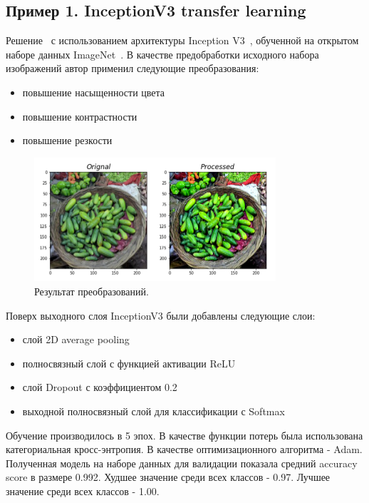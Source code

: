 \documentclass[a4paper,12pt]{extarticle}
\begin{document}
\subsection{Пример 1. InceptionV3 transfer learning}

Решение~\cite{example_1} с использованием архитектуры Inception V3~\cite{inceptionV3}, обученной
на открытом наборе данных ImageNet~\cite{imagenet}. В качестве предобработки исходного набора
изображений автор применил следующие преобразования:

\begin{itemize}
	\item повышение насыщенности цвета
	\item повышение контрастности
	\item повышение резкости
\end{itemize}

\begin{figure}[ht]
	\centering
	\includegraphics[width=0.8\textwidth]{example_1.png}
	\caption{Результат преобразований.}
	\label{fig:example_1}
\end{figure}

Поверх выходного слоя InceptionV3 были добавлены следующие слои:

\begin{itemize}
    \item слой 2D average pooling
    \item полносвязный слой с функцией активации ReLU
    \item слой Dropout с коэффициентом 0.2
    \item выходной полносвязный слой для классификации с Softmax
\end{itemize}

Обучение производилось в 5 эпох. В качестве функции потерь была использована категориальная
кросс-энтропия. В качестве оптимизационного алгоритма - Adam.
Полученная модель на наборе данных для валидации показала средний accuracy score в размере 0.992.
Худшее значение среди всех классов - 0.97. Лучшее значение среди всех классов - 1.00.
\end{document}
